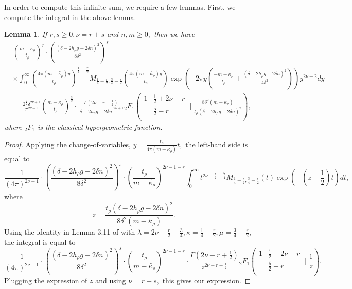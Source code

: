 \documentclass[10pt]{amsart}
\newtheorem{lemma}[theorem]{Lemma}
\theoremstyle{definition}
\theoremstyle{remark}
\numberwithin{equation}{section}
\begin{document}
		In order to compute this infinite sum, we require a few lemmas. First, we compute the integral in the above lemma.
	
	\begin{lemma}\label{lem:IntComputation}
		If $r,s\geq 0, \nu=r+s$ and $n,m\geq 0,$ then we have 
		\begin{align*}
			&\left(\frac{m-\widetilde{\kappa_\rho}}{t_\rho}\right)^r\cdot\left(\frac{(\delta-2h_\rho g-2\delta n)^2}{8\delta^2}\right)^s\\
			& \times \int_0^\infty  \left(\frac{4\pi(m-\widetilde{\kappa_\rho})y}{t_\rho}\right)^{\frac{1}{4}-\frac{r}{2}}M_{\frac{1}{4}-\frac{r}{2},\frac{3}{4}-\frac{r}{2}}\left(\frac{4\pi(m-\widetilde{\kappa_\rho})y}{t_\rho}\right)\exp\left(-2\pi y\left(\frac{-m+\widetilde{\kappa_\rho}}{t_\rho}+\frac{(\delta-2h_\rho g-2\delta n)^2}{4\delta^2}\right)\right)y^{2\nu-2}dy \\
			&=\frac{2^{\frac{7}{2}}\delta^{2\nu+1}}{\pi^{2\nu-1}}\left(\frac{m-\widetilde{\kappa_\rho}}{t_\rho}\right)^{\frac{3}{2}}\cdot\frac{\Gamma\left(2\nu-r+\frac{1}{2}\right)}{|\delta-2h_\rho g-2\delta n|^{2\nu+1}}{_2F_1}\left(\begin{array}{cc}
				1 & \frac{1}{2}+2\nu-r\\
				~& \frac{5}{2}-r \\
			\end{array}\mid \frac{8\delta^2(m-\widetilde{\kappa_\rho})}{t_\rho(\delta-2h_\rho g-2\delta n)^2}\right),
		\end{align*}
		where ${_2F_1}$ is the classical hypergeometric function.
	\end{lemma}
	
	\begin{proof}
		Applying the change-of-variables, $y=\frac{t_\rho}{4\pi(m-\widetilde{\kappa_\rho})}t,$ the left-hand side is equal to
		$$
		\frac{1}{(4\pi)^{2\nu-1}}\cdot\left(\frac{(\delta-2h_\rho g-2\delta n)^2}{8\delta^2}\right)^s\cdot \left(\frac{t_\rho}{m-\widetilde{\kappa_\rho}}\right)^{2\nu-1-r}\int_0^\infty t^{2\nu-\frac{r}{2}-\frac{7}{4}}M_{\frac{1}{4}-\frac{r}{2},\frac{3}{4}-\frac{r}{2}}(t)\exp\left(-\left(z-\frac{1}{2}\right)t\right)dt,
		$$
		where
		$$
		z=\frac{t_\rho(\delta-2h_\rho g-2\delta n)^2}{8\delta^2(m-\widetilde{\kappa_\rho})}.
		$$
		Using the identity in Lemma 3.11 of \cite{Gomez} with $\lambda=2\nu-\frac{r}{2}-\frac{3}{4}, \kappa=\frac{1}{4}-\frac{r}{2},\mu=\frac{3}{4}-\frac{r}{2},$ the integral is equal to
		$$
		\frac{1}{(4\pi)^{2\nu-1}}\cdot\left(\frac{(\delta-2h_\rho g-2\delta n)^2}{8\delta^2}\right)^s\cdot \left(\frac{t_\rho}{m-\widetilde{\kappa_\rho}}\right)^{2\nu-1-r}\cdot\frac{\Gamma\left(2\nu-r+\frac{1}{2}\right)}{z^{2\nu-r+\frac{1}{2}}}{_2F_1}\left(\begin{array}{cc}
			1 & \frac{1}{2}+2\nu-r\\
			~& \frac{5}{2}-r \\
		\end{array}\mid \frac{1}{z}\right).
		$$
		Plugging the expression of $z$ and using $\nu=r+s,$ this gives our expression.
	\end{proof}
	
\end{document}
